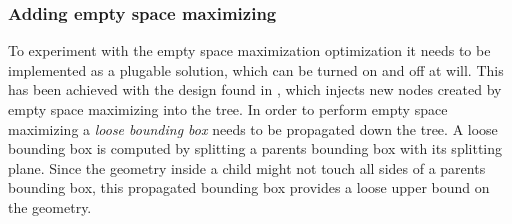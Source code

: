 


\subsubsection{Adding empty space maximizing}\label{sec:gpuEmptySpace}


To experiment with the empty space maximization optimization it needs to be
implemented as a plugable solution, which can be turned on and off at will. This
has been achieved with the design found in ,
which injects new nodes created by empty space maximizing into the tree. In
order to perform empty space maximizing a \textit{loose bounding box} needs to
be propagated down the tree. A loose bounding box is computed by splitting a
parents bounding box with its splitting plane. Since the geometry inside a child
might not touch all sides of a parents bounding box, this propagated bounding
box provides a loose upper bound on the geometry.

